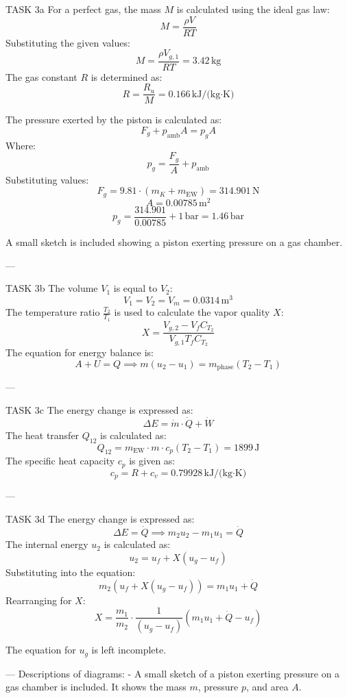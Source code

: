 TASK 3a  
For a perfect gas, the mass \( M \) is calculated using the ideal gas law:  
\[
M = \frac{\rho V}{RT}
\]  
Substituting the given values:  
\[
M = \frac{\rho V_{g,1}}{RT} = 3.42 \, \text{kg}
\]  
The gas constant \( R \) is determined as:  
\[
R = \frac{R_u}{M} = 0.166 \, \text{kJ/(kg·K)}
\]  

The pressure exerted by the piston is calculated as:  
\[
F_g + p_{\text{amb}} A = p_g A
\]  
Where:  
\[
p_g = \frac{F_g}{A} + p_{\text{amb}}
\]  
Substituting values:  
\[
F_g = 9.81 \cdot (m_K + m_{\text{EW}}) = 314.901 \, \text{N}
\]  
\[
A = 0.00785 \, \text{m}^2
\]  
\[
p_g = \frac{314.901}{0.00785} + 1 \, \text{bar} = 1.46 \, \text{bar}
\]  

A small sketch is included showing a piston exerting pressure on a gas chamber.  

---

TASK 3b  
The volume \( V_1 \) is equal to \( V_2 \):  
\[
V_1 = V_2 = V_m = 0.0314 \, \text{m}^3
\]  
The temperature ratio \( \frac{T_2}{T_1} \) is used to calculate the vapor quality \( X \):  
\[
X = \frac{V_{g,2} - V_{f} C_{T_2}}{V_{g,1} T_{f} C_{T_2}}
\]  
The equation for energy balance is:  
\[
A + U = Q \implies m (u_2 - u_1) = m_{\text{phase}} (T_2 - T_1)
\]  

---

TASK 3c  
The energy change is expressed as:  
\[
\Delta E = \dot{m} \cdot \dot{Q} + \dot{W}
\]  
The heat transfer \( Q_{12} \) is calculated as:  
\[
Q_{12} = m_{\text{EW}} \cdot m \cdot c_p (T_2 - T_1) = 1899 \, \text{J}
\]  
The specific heat capacity \( c_p \) is given as:  
\[
c_p = R + c_v = 0.79928 \, \text{kJ/(kg·K)}
\]  

---

TASK 3d  
The energy change is expressed as:  
\[
\Delta E = \dot{Q} \implies m_2 u_2 - m_1 u_1 = \dot{Q}
\]  
The internal energy \( u_2 \) is calculated as:  
\[
u_2 = u_f + X (u_{g} - u_f)
\]  
Substituting into the equation:  
\[
m_2 (u_f + X (u_{g} - u_f)) = m_1 u_1 + \dot{Q}
\]  
Rearranging for \( X \):  
\[
X = \frac{m_1}{m_2} \cdot \frac{1}{(u_{g} - u_f)} \left( m_1 u_1 + \dot{Q} - u_f \right)
\]  

The equation for \( u_g \) is left incomplete.  

---  
Descriptions of diagrams:  
- A small sketch of a piston exerting pressure on a gas chamber is included. It shows the mass \( m \), pressure \( p \), and area \( A \).  

